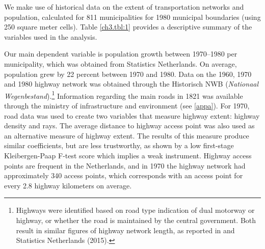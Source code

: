 \documentclass[a4paper,authoryear,review]{elsarticle}  	%
\begin{document}
	We make use of historical data on the extent of transportation networks and population, calculated for 811 municipalities for 1980 municipal boundaries (using 250 square meter cells). Table \ref{ch3.tbl:1} provides a descriptive summary of the variables used in the analysis. 
	
	
	
	Our main dependent variable is population growth between 1970--1980 per municipality, which was obtained from Statistics Netherlands. On average, population grew by 22 percent between 1970 and 1980. Data on the 1960, 1970 and 1980 highway network was obtained through the Historisch NWB (\emph{Nationaal Wegenbestand}).\footnote{Highways were identified based on road type indication of dual motorway or highway, or whether the road is maintained by the central government. Both result in similar figures of highway network length, as reported in \citet{Ligtermoet1990} and Statistics Netherlands (2015).} Information regarding the main roads in 1821 was available through the ministry of infrastructure and environment (see \ref{appa}). For 1970, road data was used to create two variables that measure highway extent: highway density and rays. The average distance to highway access point was also used as an alternative measure of highway extent. The results of this measure produce similar coefficients, but are less trustworthy, as shown by a low first-stage Kleibergen-Paap F-test score which implies a weak instrument. Highway access points are frequent in the Netherlands, and in 1970 the highway network had approximately 340 access points, which corresponds with an access point for every 2.8 highway kilometers on average.
	
\end{document}
